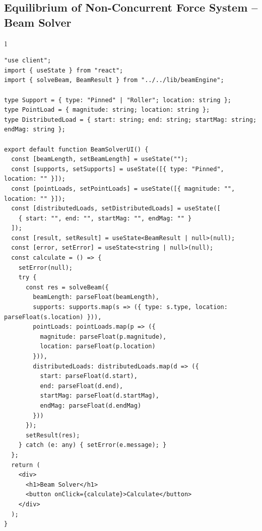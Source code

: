 \subsection*{Equilibrium of Non-Concurrent Force System -- Beam Solver}
\begin{spacing}{1}
\begin{Verbatim}[breaklines=true, breaksymbolleft={}, breaksymbolright={}]
"use client";
import { useState } from "react";
import { solveBeam, BeamResult } from "../../lib/beamEngine";

type Support = { type: "Pinned" | "Roller"; location: string };
type PointLoad = { magnitude: string; location: string };
type DistributedLoad = { start: string; end: string; startMag: string; endMag: string };

export default function BeamSolverUI() {
  const [beamLength, setBeamLength] = useState("");
  const [supports, setSupports] = useState([{ type: "Pinned", location: "" }]);
  const [pointLoads, setPointLoads] = useState([{ magnitude: "", location: "" }]);
  const [distributedLoads, setDistributedLoads] = useState([
    { start: "", end: "", startMag: "", endMag: "" }
  ]);
  const [result, setResult] = useState<BeamResult | null>(null);
  const [error, setError] = useState<string | null>(null);
  const calculate = () => {
    setError(null);
    try {
      const res = solveBeam({
        beamLength: parseFloat(beamLength),
        supports: supports.map(s => ({ type: s.type, location: parseFloat(s.location) })),
        pointLoads: pointLoads.map(p => ({
          magnitude: parseFloat(p.magnitude),
          location: parseFloat(p.location)
        })),
        distributedLoads: distributedLoads.map(d => ({
          start: parseFloat(d.start),
          end: parseFloat(d.end),
          startMag: parseFloat(d.startMag),
          endMag: parseFloat(d.endMag)
        }))
      });
      setResult(res);
    } catch (e: any) { setError(e.message); }
  };
  return (
    <div>
      <h1>Beam Solver</h1>
      <button onClick={calculate}>Calculate</button>
    </div>
  );
}
\end{Verbatim}
\end{spacing}

